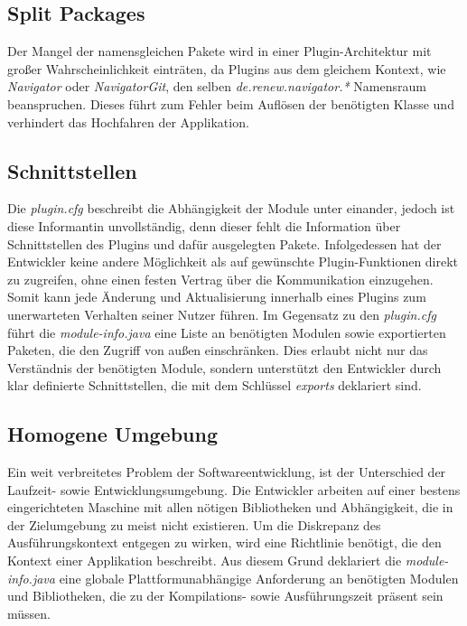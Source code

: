 \subsection{Split Packages}
	Der Mangel der namensgleichen Pakete wird in einer Plugin-Architektur mit großer Wahrscheinlichkeit einträten, da Plugins aus dem gleichem Kontext, wie \textit{Navigator} oder \textit{NavigatorGit}, den selben \textit{de.renew.navigator.*} Namensraum beanspruchen. Dieses führt zum Fehler beim Auflösen der benötigten Klasse und verhindert das Hochfahren der Applikation. 

\subsection{Schnittstellen}
	Die \textit{plugin.cfg} beschreibt die Abhängigkeit der Module unter einander, jedoch ist diese Informantin unvollständig, denn dieser fehlt die Information über Schnittstellen des Plugins und dafür ausgelegten Pakete. Infolgedessen hat der Entwickler keine andere Möglichkeit als auf gewünschte Plugin-Funktionen direkt zu zugreifen, ohne einen festen Vertrag über die Kommunikation einzugehen. Somit kann jede Änderung und Aktualisierung innerhalb eines Plugins zum unerwarteten Verhalten seiner Nutzer führen. \newline
	Im Gegensatz zu den \textit{plugin.cfg} führt die \textit{module-info.java} eine Liste an benötigten Modulen sowie exportierten Paketen, die den Zugriff von außen einschränken. Dies erlaubt nicht nur das Verständnis der benötigten Module, sondern unterstützt den Entwickler durch klar definierte Schnittstellen, die mit dem Schlüssel \textit{exports} deklariert sind.

\subsection{Homogene Umgebung}
	Ein weit verbreitetes Problem der Softwareentwicklung, ist der Unterschied der Laufzeit- sowie Entwicklungsumgebung. Die Entwickler arbeiten auf einer bestens eingerichteten Maschine mit allen nötigen Bibliotheken und Abhängigkeit, die in der Zielumgebung zu meist nicht existieren. Um die Diskrepanz des Ausführungskontext entgegen zu wirken, wird eine Richtlinie benötigt, die den Kontext einer Applikation beschreibt. Aus diesem Grund deklariert die \textit{module-info.java} eine globale Plattformunabhängige Anforderung an benötigten Modulen und Bibliotheken, die zu der Kompilations- sowie Ausführungszeit präsent sein müssen.\bigbreak

